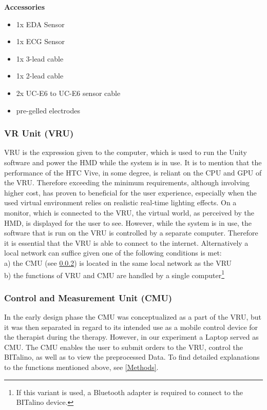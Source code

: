 \textbf{Accessories}
\begin{itemize}
\item 1x EDA Sensor
\item 1x ECG Sensor
\item 1x 3-lead cable
\item 1x 2-lead cable
\item 2x UC-E6 to UC-E6 sensor cable
\item pre-gelled electrodes
\end{itemize}

\subsubsection{VR Unit (VRU)}
VRU is the expression given to the computer, which is used to run the Unity software and power the HMD while the system is in use. It is to mention that the performance of the HTC Vive, in some degree, is reliant on the CPU and GPU of the VRU. Therefore exceeding the minimum requirements, although involving higher cost, has proven to beneficial for the user experience, especially when the used virtual environment relies on realistic real-time lighting effects. On a monitor, which is connected to the VRU, the virtual world, as perceived by the HMD, is displayed for the user to see. However, while the system is in use, the software that is run on the VRU is controlled by a separate computer. Therefore it is essential that the VRU is able to connect to the internet. Alternatively a local network can suffice given one of the following conditions is met:\\[10pt]
a) the CMU (see \ref{CMU}) is located in the same local network as the VRU\\
b) the functions of VRU and CMU are handled by a single computer\footnote{If this variant is used, a Bluetooth adapter is required to connect to the BITalino device.}
 
\subsubsection{Control and Measurement Unit (CMU)}\label{CMU}
In the early design phase the CMU was conceptualized as a part of the VRU, but it was then separated in regard to its intended use as a mobile control device for the therapist during the therapy. However, in our experiment a Laptop served as CMU. The CMU enables the user to submit orders to the VRU, control the BITalino, as well as to view the preprocessed Data. To find detailed explanations to the functions mentioned above, see \ref{Methods}.

